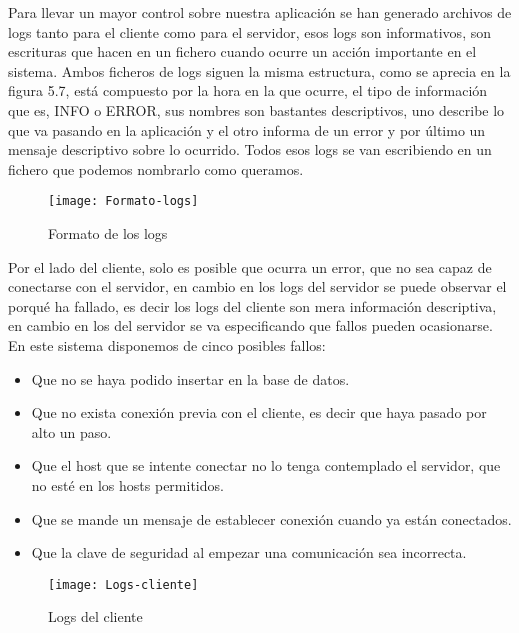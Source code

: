 \documentclass[ spanish, a4paper, 12pt, oneside]{report}
\begin{document}
Para llevar un mayor control sobre nuestra aplicación se han generado archivos de logs tanto para el cliente como para el servidor, esos logs son informativos, son escrituras que hacen en un fichero cuando ocurre un acción importante en el sistema. 
Ambos ficheros de logs siguen la misma estructura, como se aprecia en la figura 5.7, está compuesto por la hora en la que ocurre, el tipo de información que es, INFO o ERROR, sus nombres son bastantes descriptivos, uno describe lo que va pasando en la aplicación 
y el otro informa de un error y por último un mensaje descriptivo sobre lo ocurrido. Todos esos logs se van escribiendo en un fichero que podemos nombrarlo como queramos. \\

\begin{figure}[!h]
   \centering
   \texttt{[image: Formato-logs]}\\
      \caption{\label{fig: Formato de los logs} Formato de los logs}
\end{figure}

Por el lado del cliente, solo es posible que ocurra un error, que no sea capaz de conectarse con el servidor, en cambio en los logs del servidor se puede observar el porqué ha fallado, es decir los logs del cliente son mera información descriptiva, en cambio en los del servidor 
se va especificando que fallos pueden ocasionarse. En este sistema disponemos de cinco posibles fallos: 


\begin{itemize}
   \item Que no se haya podido insertar en la base de datos.
   \item Que no exista conexión previa con el cliente, es decir que haya pasado por alto un paso.
   \item Que el host que se intente conectar no lo tenga contemplado el servidor, que no esté en los hosts permitidos.
   \item Que se mande un mensaje de establecer conexión cuando ya están conectados.
   \item Que la clave de seguridad al empezar una comunicación sea incorrecta.
\end{itemize}

\begin{figure}[!h]
   \centering
   \texttt{[image: Logs-cliente]}\\
      \caption{\label{fig: Logs del cliente} Logs del cliente}
\end{figure}
\end{document}
